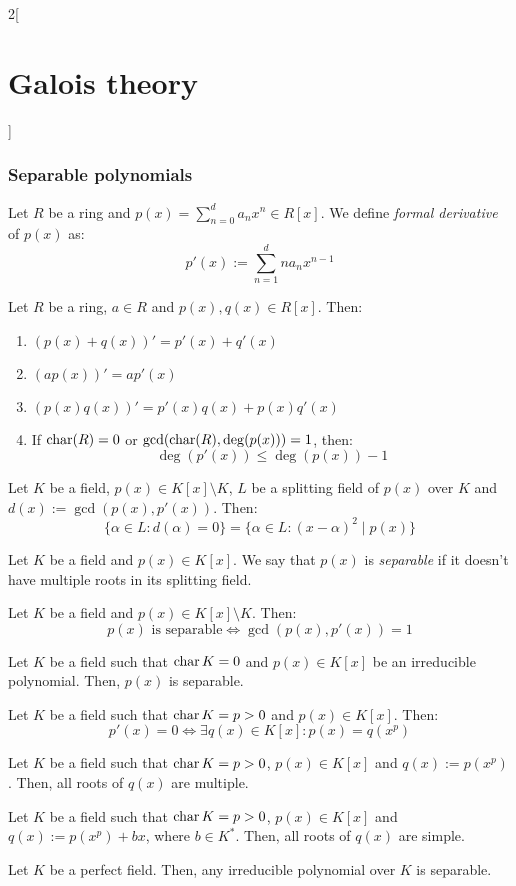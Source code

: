 \documentclass[../../../main.tex]{subfiles}
\begin{document}
\begin{multicols}{2}[\section{Galois theory}]
  \subsubsection{Separable polynomials}
  \begin{definition}
    Let $R$ be a ring and $p(x)=\sum_{n=0}^da_nx^n\in R[x]$. We define \emph{formal derivative} of $p(x)$ as: $$p'(x):=\sum_{n=1}^dna_nx^{n-1}$$
  \end{definition}
  \begin{prop}
    Let $R$ be a ring, $a\in R$ and $p(x),q(x)\in R[x]$. Then:
    \begin{enumerate}
      \item ${(p(x)+q(x))}'=p'(x)+q'(x)$
      \item $(ap(x))'=ap'(x)$
      \item $(p(x)q(x))'=p'(x)q(x)+p(x)q'(x)$
      \item If $\operatorname{char}(R)=0$ or $\gcd(\operatorname{char}(R),\deg(p(x)))=1$, then: $$\deg(p'(x))\leq\deg(p(x))-1$$
    \end{enumerate}
  \end{prop}
  \begin{prop}
    Let $K$ be a field, $p(x)\in K[x]\setminus K$, $L$ be a splitting field of $p(x)$ over $K$ and $d(x):=\gcd(p(x),p'(x))$. Then:
    $$\{\alpha\in L:d(\alpha)=0\}=\{\alpha\in L:{(x-\alpha)}^2\mid p(x)\}$$
  \end{prop}
  \begin{definition}
    Let $K$ be a field and $p(x)\in K[x]$. We say that $p(x)$ is \emph{separable} if it doesn't have multiple roots in its splitting field.
  \end{definition}
  \begin{corollary}
    Let $K$ be a field and $p(x)\in K[x]\setminus K$. Then: $$p(x)\text{ is separable}\iff\gcd(p(x),p'(x))=1$$
  \end{corollary}
  \begin{corollary}
    Let $K$ be a field such that $\operatorname{char} K=0$ and $p(x)\in K[x]$ be an irreducible polynomial. Then, $p(x)$ is separable.
  \end{corollary}
  \begin{lemma}
    Let $K$ be a field such that $\operatorname{char} K=p>0$ and $p(x)\in K[x]$. Then: $$p'(x)=0\iff\exists q(x)\in K[x]:p(x)=q(x^p)$$
  \end{lemma}
  \begin{corollary}
    Let $K$ be a field such that $\operatorname{char} K=p>0$, $p(x)\in K[x]$ and $q(x):=p(x^p)$. Then, all roots of $q(x)$ are multiple.
  \end{corollary}
  \begin{corollary}
    Let $K$ be a field such that $\operatorname{char} K=p>0$, $p(x)\in K[x]$ and $q(x):=p(x^p)+bx$, where $b\in K^*$. Then, all roots of $q(x)$ are simple.
  \end{corollary}
  \begin{theorem}
    Let $K$ be a perfect field. Then, any irreducible polynomial over $K$ is separable.
  \end{theorem}

\end{multicols}
\end{document}
